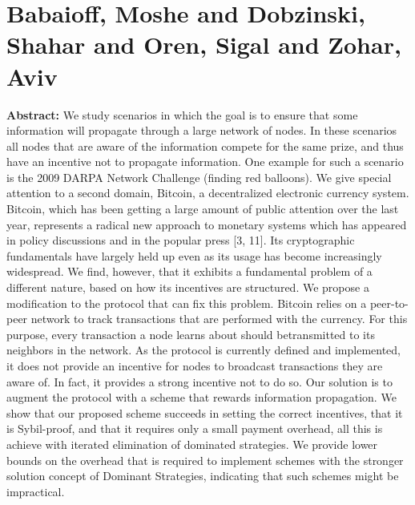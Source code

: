\section{Babaioff, Moshe and Dobzinski, Shahar and Oren, Sigal and Zohar, Aviv }

\textbf{Abstract:} 
We study scenarios in which the goal is to ensure that some information will propagate through a large network of nodes. In these scenarios all nodes that are aware of the information compete for the same prize, and thus have an incentive not to propagate information. One example for such a scenario is the 2009 DARPA Network Challenge (finding red balloons). We give special attention to a second domain, Bitcoin, a decentralized electronic currency system. Bitcoin, which has been getting a large amount of public attention over the last year, represents a radical new approach to monetary systems which has appeared in policy discussions and in the popular press [3, 11].  Its cryptographic fundamentals have largely held up even as its usage has become increasingly widespread.  We find, however, that it exhibits a fundamental problem of a different nature, based on how its incentives are structured.  We propose a modification to the protocol that can fix this problem. Bitcoin relies on a peer-to-peer network to track transactions that are performed with the currency. For this purpose, every transaction a node learns about should betransmitted to its neighbors in the network. As the protocol is currently defined and implemented, it does not provide an incentive for nodes to broadcast transactions they are aware of. In fact, it provides a strong incentive not to do so. Our solution is to augment the protocol with a scheme that rewards information propagation. We show that our proposed scheme succeeds in setting the correct incentives, that it is Sybil-proof, and that it requires only a small payment overhead, all this is achieve with iterated elimination of dominated strategies. We provide lower bounds on the overhead that is required to implement schemes with the stronger solution concept of Dominant Strategies, indicating that such schemes might be impractical.

